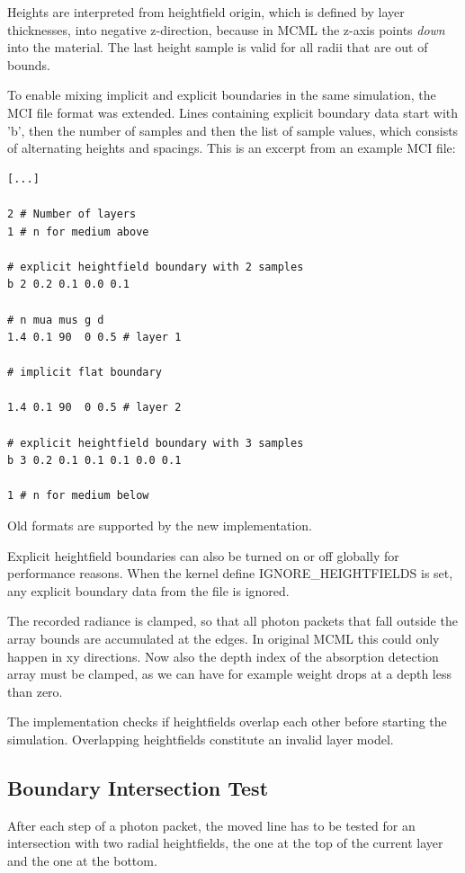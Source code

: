 \documentclass[]{article}
\begin{document}
Heights are interpreted from heightfield origin, which is defined by layer thicknesses, into negative z-direction, because in MCML the z-axis points \emph{down} into the material. The last height sample is valid for all radii that are out of bounds.

To enable mixing implicit and explicit boundaries in the same simulation, the MCI file format was extended. Lines containing explicit boundary data start with 'b', then the number of samples and then the list of sample values, which consists of alternating heights and spacings. This is an excerpt from an example MCI file:

\begin{lstlisting}
[...]

2 # Number of layers
1 # n for medium above

# explicit heightfield boundary with 2 samples
b 2 0.2 0.1 0.0 0.1

# n mua mus g d
1.4 0.1 90  0 0.5 # layer 1

# implicit flat boundary

1.4 0.1 90  0 0.5 # layer 2

# explicit heightfield boundary with 3 samples
b 3 0.2 0.1 0.1 0.1 0.0 0.1

1 # n for medium below
\end{lstlisting}

Old formats are supported by the new implementation.

Explicit heightfield boundaries can also be turned on or off globally for performance reasons. When the kernel define IGNORE\_HEIGHTFIELDS is set, any explicit boundary data from the file is ignored.

The recorded radiance is clamped, so that all photon packets that fall outside the array bounds are accumulated at the edges. In original MCML this could only happen in xy directions. Now also the depth index of the absorption detection array must be clamped, as we can have for example weight drops at a depth less than zero.

The implementation checks if heightfields overlap each other before starting the simulation. Overlapping heightfields constitute an invalid layer model.

\subsection{Boundary Intersection Test}

After each step of a photon packet, the moved line has to be tested for an intersection with two radial heightfields, the one at the top of the current layer and the one at the bottom.
\end{document}
